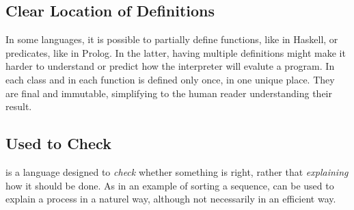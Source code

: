 \subsection{Clear Location of Definitions}

In some languages, it is possible to partially define functions, like in Haskell, or predicates, like in Prolog.
In the latter, having multiple definitions might make it harder to understand or predict how the interpreter will evalute a program.
In \Soda each class and in each function is defined only once, in one unique place.
They are final and immutable, simplifying to the human reader understanding their result.

\subsection{Used to Check}

\Soda is a language designed to \textit{check} whether something is right, rather that \textit{explaining} how it should be done.
As in an example of sorting a sequence, \Soda can be used to explain a process in a naturel way, although not necessarily in an efficient way.


